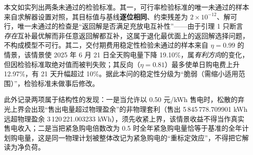 本文如实列出两条未通过的检验标准。其一，可行率检验标准的唯一未通过的样本来自求解器设置对照，其目标值与基线\textbf{逐位相同}、约束残差为 $2\times10^{-12}$、解可行，唯一未通过的检查是“返回解是否满足充放电互补性”——由于引理 1 只断言\emph{存在}互补最优解而非任意返回解都互补，这属于退化最优面上的返回解选择问题，不构成模型不可行。其二，交付期费用稳定性检验未通过的样本来自 $\eta=0.99$ 的情景，该情景使 2025 年 6 月 21 日全天购电量下降 19.10\%，属\emph{有利方向}的变化，但因检验标准取绝对值而被判失败；其反向（$\eta=0.81$）最多使单日购电费上升 12.97\%，有 21 天升幅超过 10\%。据此本问的稳定性分级为“脆弱（需缩小适用范围）”，检验标准未做事后修改。

此外记录两项属于结构性的发现：一是当允许以 0.50 元/kWh 售电时，松散的弃光上界会出现“售出电量超过物理盈余”的非物理套利（售出 5\,845\,778.709901 kWh 远超物理盈余 3\,120\,221.003233 kWh），须先收紧上界，该情景收益不得当作真实售电收入；二是当把紧急购电倍数改为 0.5 时全年紧急购电量恰等于基准的全年计划购电量，这是同一物理计划被整体改记为紧急购电的“重标定效应”，不得把它解读为净负荷。
